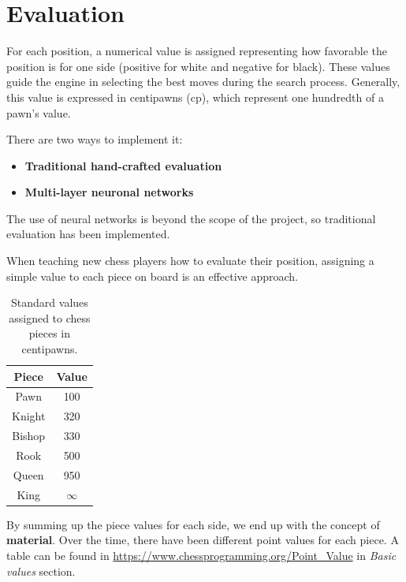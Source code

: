 \section{Evaluation}

For each position, a numerical value is assigned representing how favorable the position is for one side (positive for white and negative for black). These values guide the engine in selecting the best moves during the search process. Generally, this value is expressed in centipawns (cp), which represent one hundredth of a pawn's value.

\vspace{1em}

\noindent There are two ways to implement it:

\begin{itemize}
    \item \textbf{Traditional hand-crafted evaluation}
    \item \textbf{Multi-layer neuronal networks}
\end{itemize}

\noindent The use of neural networks is beyond the scope of the project, so traditional evaluation has been implemented.

\vspace{1em}

\noindent When teaching new chess players how to evaluate their position, assigning a simple value to each piece on board is an effective approach.

\begin{table}[H]
    \centering
    \begin{tabular}{|c|c|}
        \hline
        \textbf{Piece} & \textbf{Value} \\ \hline
        Pawn & 100 \\ \hline
        Knight & 320 \\ \hline
        Bishop & 330 \\ \hline
        Rook & 500 \\ \hline
        Queen & 950 \\ \hline
        King & $\infty$ \\ \hline
    \end{tabular}
    \caption{Standard values assigned to chess pieces in centipawns.}
    \label{tab:piece-values}
\end{table}

\noindent By summing up the piece values for each side, we end up with the concept of \textbf{material}. Over the time, there have been different point values for each piece. A table can be found in \url{https://www.chessprogramming.org/Point_Value} in \textit{Basic values} section.

